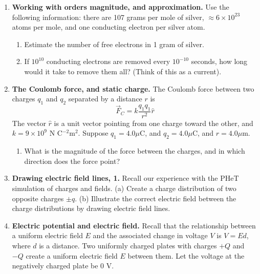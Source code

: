 \documentclass[10pt]{article}
\begin{document}
\maketitle

\begin{enumerate}
\item \textbf{Working with orders magnitude, and approximation.} Use the following information: there are 107 grams per mole of silver, $\approx 6 \times 10^{23}$ atoms per mole, and one conducting electron per silver atom. 
\begin{enumerate}
\item Estimate the number of free electrons in 1 gram of silver. \\ \vspace{1cm}
\item If $10^{10}$ conducting electrons are removed every $10^{-10}$ seconds, how long would it take to remove them all? (Think of this as a current). \\ \vspace{1cm}
\end{enumerate}
\item \textbf{The Coulomb force, and static charge.} The Coulomb force between two charges $q_1$ and $q_2$ separated by a distance $r$ is 
\begin{equation}
 	\vec{F}_C = k\frac{q_1 q_1}{r^2}\hat{r}
\end{equation}
The vector $\hat{r}$ is a unit vector pointing from one charge toward the other, and $k = 9\times 10^9$ N C$^{-2}$m$^{2}$.  Suppose $q_1 = 4.0 \mu$C, and $q_2 = 4.0 \mu$C, and $r=4.0 \mu$m. \\
\begin{enumerate}
\item What is the magnitude of the force between the charges, and in which direction does the force point? \\ \vspace{2cm}
\end{enumerate}
\item \textbf{Drawing electric field lines, 1.} Recall our experience with the PHeT simulation of charges and fields.  (a) Create a charge distribution of two opposite charges $\pm q$. (b) Illustrate the correct electric field between the charge distributions by drawing electric field lines. \\ \vspace{3cm}
\item \textbf{Electric potential and electric field.} Recall that the relationship between a uniform electric field $E$ and the associated change in voltage $V$ is $V = Ed$, where $d$ is a distance.  Two uniformly charged plates with charges $+Q$ and $-Q$ create a uniform electric field $E$ between them.  Let the voltage at the negatively charged plate be 0 V.

\end{enumerate}
\end{document}
